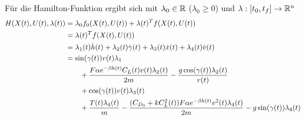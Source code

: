 Für die Hamilton-Funktion ergibt sich mit $\lambda_0 \in \mathbb{R}$ ($\lambda_0 \geq 0$) und $\lambda : [t_0,t_f] \to \mathbb{R}^n$
\begin{equation} \label{equ:hamilt_func}
    \begin{split}
        H(X(t),U(t),\lambda(t)) &= \lambda_0 f_0(X(t),U(t)) + \lambda(t)^T f(X(t),U(t)) \\\
        &= \lambda(t)^T f(X(t),U(t)) \\\
        &= \lambda_1(t) \dot{h}(t) + \lambda_2(t) \dot{\gamma}(t) + \lambda_3(t) \dot{x}(t) + \lambda_4(t) \dot{v}(t) \\\
        &= \sin(\gamma(t)) v(t) \lambda_1 \\\
        &\hspace{7mm} + \dfrac{F \alpha e^{-\beta h(t)} C_L(t) v(t) \lambda_2(t)}{2m} - \dfrac{g \cos(\gamma(t)) \lambda_2(t)}{v(t)} \\\
        &\hspace{7mm} + \cos(\gamma(t)) v(t) \lambda_3(t) \\\
        &\hspace{7mm} + \dfrac{T(t) \lambda_4(t)}{m} - \dfrac{(C_{D_0} + k C_L^2(t)) F \alpha e^{-\beta h(t)} v^2(t) \lambda_4(t)}{2m} - g \sin(\gamma(t)) \lambda_4(t)
    \end{split}
\end{equation}

